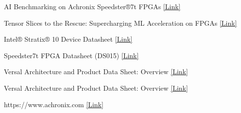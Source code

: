 \begin{latin}
	\begin{thebibliography}{9}
		AI Benchmarking on Achronix Speedster®7t FPGAs
		\href{https://www.achronix.com/sites/default/files/docs/AI_Micro_benchmarking_on_Achronix_Speedster7t_FPGA_WP999.pdf}{[Link]}
		
		
		Tensor Slices to the Rescue: Supercharging ML Acceleration on
		FPGAs
		\href{https://lca.ece.utexas.edu/pubs/Tensor_Slice___FPGA2021__Dec8_2020.pdf}{[Link]}
		
		
		Intel® Stratix® 10 Device Datasheet
		\href{file:///home/reza/Downloads/s10_datasheet-683181-666450.pdf}{[Link]}
		
		
		Speedster7t FPGA
		Datasheet (DS015)
		\href{https://www.achronix.com/sites/default/files/docs/Speedster7t_FPGA_Datasheet_DS015_6.pdf}{[Link]}
		
		
		Versal Architecture and
		Product Data Sheet: Overview
		\href{https://www.mouser.com/datasheet/2/903/ds950_versal_overview-2634331.pdf}{[Link]}
		
		
		
		Versal Architecture and
		Product Data Sheet: Overview
		\href{https://docs.amd.com/r/en-US/ug1273-versal-acap-design}{[Link]}
		
		
		https://www.achronix.com
		\href{https://www.achronix.com/product/speedster7t-fpgas}{[Link]}
		
	\end{thebibliography} 
\end{latin}








